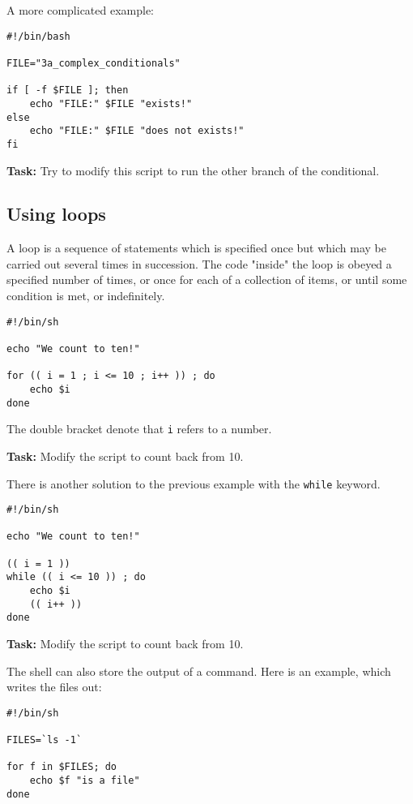 \documentclass{article}\usepackage[]{graphicx}\usepackage[usenames,dvipsnames]{color}
\begin{document}
A more complicated example:

\begin{verbatim}
#!/bin/bash

FILE="3a_complex_conditionals"

if [ -f $FILE ]; then
    echo "FILE:" $FILE "exists!"
else
    echo "FILE:" $FILE "does not exists!"
fi
\end{verbatim}

\textbf{Task:} Try to modify this script to run the other branch of the conditional.

\subsection*{Using loops}

A loop is a sequence of statements which is specified once but which may be carried out several times in succession. The code "inside" the loop is obeyed a specified number of times, or once for each of a collection of items, or until some condition is met, or indefinitely.

\begin{verbatim}
#!/bin/sh

echo "We count to ten!"

for (( i = 1 ; i <= 10 ; i++ )) ; do
    echo $i
done
\end{verbatim}

The double bracket denote that \verb+i+ refers to a number.

\textbf{Task:} Modify the script to count back from 10.

There is another solution to the previous example with the \verb+while+ keyword.

\begin{verbatim}
#!/bin/sh

echo "We count to ten!"

(( i = 1 ))
while (( i <= 10 )) ; do
    echo $i
    (( i++ ))
done
\end{verbatim}

\textbf{Task:} Modify the script to count back from 10.

The shell can also store the output of a command. Here is an example, which writes the files out:

\begin{verbatim}
#!/bin/sh

FILES=`ls -1`

for f in $FILES; do
    echo $f "is a file"
done
\end{verbatim}
\end{document}
